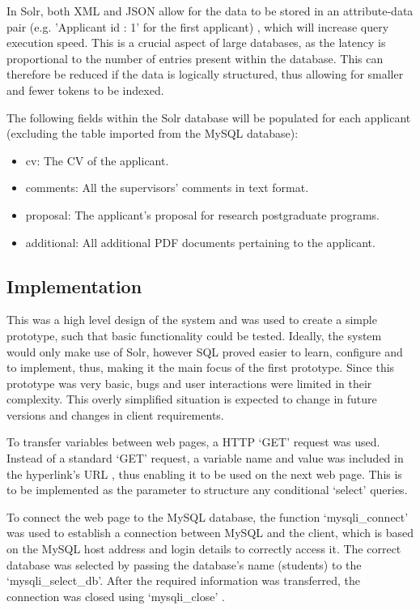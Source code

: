 \documentclass[journal]{IEEEtran}
\begin{document}
\hfill \break In Solr, both XML and JSON allow for the data to be stored in an attribute-data pair (e.g. 'Applicant id : 1' for the first applicant) \cite{solrguide}, which will increase query execution speed. This is a crucial aspect of large databases, as the latency is proportional to the number of entries present within the database. This can therefore be reduced if the data is logically structured, thus allowing for smaller and fewer tokens to be indexed.

\hfill \break The following fields within the Solr database will be populated for each applicant (excluding the table imported from the MySQL database):

\begin{itemize}
	\item cv: The CV of the applicant.
	\item comments: All the supervisors' comments in text format.
	\item proposal: The applicant's proposal for research postgraduate programs.
	\item additional: All additional PDF documents pertaining to the applicant.
\end{itemize}


\subsection{Implementation}

This was a high level design of the system and was used to create a simple prototype, such that basic functionality could be tested. Ideally, the system would only make use of Solr, however SQL proved easier to learn, configure and to implement, thus, making it the main focus of the first prototype. Since this prototype was very basic, bugs and user interactions were limited in their complexity. This overly simplified situation is expected to change in future versions and changes in client requirements.

\hfill \break To transfer variables between web pages, a HTTP `GET' request was used. Instead of a standard `GET' request, a variable name and value was included in the hyperlink's URL \cite{get}, thus enabling it to be used on the next web page. This is to be implemented as the parameter to structure any conditional `select' queries.

\hfill \break To connect the web page to the MySQL database, the function `mysqli\_connect' was used to establish a connection between MySQL and the client, which is based on the MySQL host address and login details to correctly access it. The correct database was selected by passing the database's name (students) to the `mysqli\_select\_db'. After the required information was transferred, the connection was closed using `mysqli\_close' \cite{phpmysql}.
\end{document}
